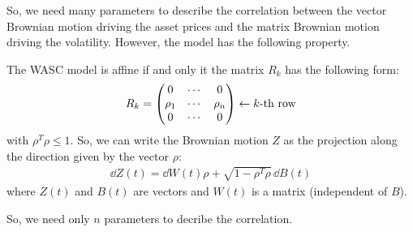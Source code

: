  So, we need many parameters to describe the correlation between the vector Brownian motion driving the asset prices and the matrix Brownian motion driving the volatility. However, the model has the following property.
\begin{proposition}
    The WASC model is affine if and only it the matrix $R_k$ has the following form:
    \begin{align}
        R_k = \mqty(0 & \cdots & 0 \\
                      \rho_1 & \cdots & \rho_n \\
                      0 & \cdots & 0) \leftarrow \text{$k$-th row}
    \end{align}
    with $\rho^T\rho \le 1$. So, we can write the Brownian motion $Z$ as the projection along the direction given by the vector $\rho$:
    \begin{align}
        \dd Z(t) = \dd W(t)\rho + \sqrt{1-\rho^T\rho}\,\dd B(t)
    \end{align}
    where $Z(t)$ and $B(t)$ are vectors and $W(t)$ is a matrix (independent of $B$).
\end{proposition}
So, we need only $n$ parameters to decribe the correlation.
